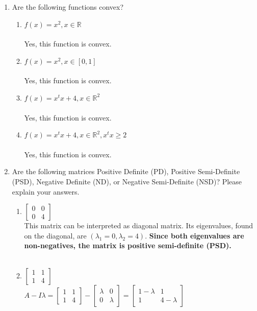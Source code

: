 \documentclass{assignment}
\newcommand{\R}{\mathbb{R}}
\begin{document}
\begin{problem}
\begin{enumerate}
\item Are the following functions convex?
\begin{enumerate}[label=\alph*)]
    \item $f(x) = x^2, x \in \R$\\\\
    Yes, this function is convex.\\
    \item $f(x) = x^2, x \in [0,1]$\\\\
    Yes, this function is convex.\\
    \item $f(x) = x^tx + 4, x \in \R^2$\\\\
    Yes, this function is convex.\\
    \item $f(x) = x^tx + 4, x \in \R^2, x^tx \geq 2$\\\\
    Yes, this function is convex.\\
\end{enumerate}

\item Are the following matrices Positive Definite (PD), Positive Semi-Definite (PSD), Negative Definite (ND), or Negative Semi-Definite (NSD)? Please explain your answers.
\begin{enumerate}[label=\alph*)]
    \item $\begin{bmatrix}
        0&0\\0&4         
    \end{bmatrix}$\\\newline
    This matrix can be interpreted as diagonal matrix. Its eigenvalues, found on the diagonal, are $(\lambda_1 = 0, \lambda_2 = 4)$. \textbf{Since both eigenvalues are non-negatives, the matrix is positive semi-definite (PSD).}\\\\

    \item $\begin{bmatrix}
        1&1\\1&4
    \end{bmatrix}$\\

    $A-I\lambda = \begin{bmatrix}
        1&1\\1&4
    \end{bmatrix} - \begin{bmatrix}
        \lambda&0\\0&\lambda
    \end{bmatrix} = \begin{bmatrix}
        1-\lambda&1\\1&4-\lambda
    \end{bmatrix}$\\


\end{enumerate}
\end{enumerate}
\end{problem}
\end{document}
